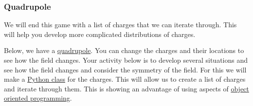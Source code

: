 \subsubsection{Quadrupole}\label{quadrupole}

We will end this game with a list of charges that we can iterate
through. This will help you develop more complicated distributions of
charges.

Below, we have a
\href{https://en.wikipedia.org/wiki/Quadrupole}{quadrupole}. You can
change the charges and their locations to see how the field changes.
Your activity below is to develop several situations and see how the
field changes and consider the symmetry of the field. For this we will
make a \href{https://docs.python.org/3/tutorial/classes.html}{Python
class} for the charges. This will allow us to create a list of charges
and iterate through them. This is showing an advantage of using aspects
of
\href{https://en.wikipedia.org/wiki/Object-oriented_programming}{object
oriented programming}.

